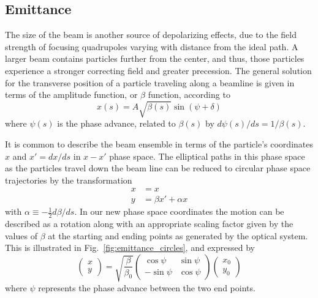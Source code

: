 \documentclass[12pt]{article}
\begin{document}
\subsection{Emittance}
The size of the beam is another source of depolarizing effects, due to the field strength of focusing quadrupoles varying with distance from the ideal path.  A larger beam contains particles further from the center, and thus, those particles experience a stronger correcting field and greater precession. 
The general solution for the transverse position of a particle traveling along a beamline is given in terms of the amplitude function, or $\beta$ function, according to
\begin{equation}
x (s) = A \sqrt{\beta (s)} \sin (\psi + \delta)
\label{eq:gensolution}
\end{equation}
where $\psi(s)$ is the phase advance, related to $\beta(s)$ by $d\psi(s)/ds = 1/\beta(s)$.  

It is common to describe the beam ensemble in terms of the particle's coordinates $x$ and $x' = dx/ds$ in $x-x'$ phase space.  The elliptical paths in this phase space as the particles travel down the beam line can be reduced to circular phase space trajectories by the transformation
\begin{align}
x &= x \\ 
y &= \beta x' + \alpha x
\end{align} 
with $\alpha \equiv -\frac12 d\beta/ds$.  In our new phase space coordinates the motion can be described as a rotation along with an appropriate scaling factor given by the values of $\beta$ at the starting and ending points as generated by the optical system. 
This is illustrated in Fig.~\ref{fig:emittance_circles}, and expressed by 
\begin{equation}
\left( \begin{array}{c}
x \\ y
\end{array} \right)
= \sqrt{\frac{\beta}{\beta_0}} 
\left( \begin{array}{cc}
\cos \psi & \sin \psi \\
- \sin \psi & \cos \psi
\end{array} \right)
\left( \begin{array}{c}
x_0 \\ y_0
\end{array} \right)
\label{eq:circemit}
\end{equation}
where $\psi$ represents the phase advance between the two end points. 
\end{document}
